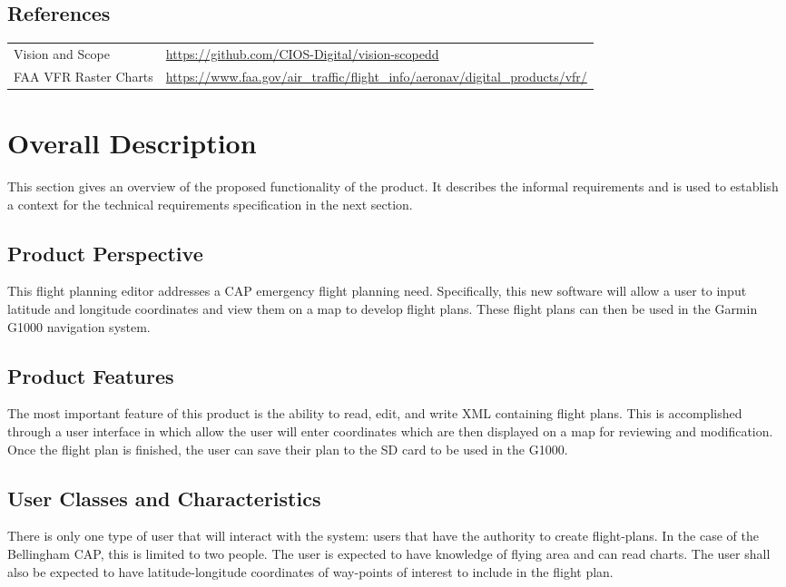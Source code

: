 \documentclass[12pt, letterpaper]{article}
\begin{document}
  \subsection{References}\label{sec:ref}
  \begin{tabularx}{\textwidth}{l|X}
    \hline
    Vision and Scope & \url{https://github.com/CIOS-Digital/vision-scopedd}\\
    FAA VFR Raster Charts & \url{https://www.faa.gov/air_traffic/flight_info/aeronav/digital_products/vfr/} \\
    \hline
  \end{tabularx}

  \newpage
\section{Overall Description}
  This section gives an overview of the proposed functionality of the product.
  It describes the informal requirements and is used to establish a context for the technical
  requirements specification in the next section.
  \subsection{Product Perspective}
    This flight planning editor addresses a CAP emergency flight planning need.
    Specifically, this new software will allow a user to input latitude and longitude coordinates
    and view them on a map to develop flight plans.
    These flight plans can then be used in the Garmin G1000 navigation system.
  \subsection{Product Features}
    The most important feature of this product is the ability to read, edit, and write XML containing flight plans.
    This is accomplished through a user interface in which allow the user will enter coordinates which are then
    displayed on a map for reviewing and modification.
    Once the flight plan is finished, the user can save their plan to the SD card to be used in the G1000.
  \subsection{User Classes and Characteristics}
    There is only one type of user that will interact with the system:
    users that have the authority to create flight-plans.
    In the case of the Bellingham CAP, this is limited to two people.
    The user is expected to have knowledge of flying area and can read charts.
    The user shall also be expected to have latitude-longitude coordinates of
    way-points of interest to include in the flight plan.
\end{document}
